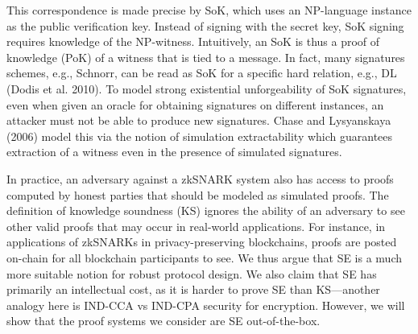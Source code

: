 \documentclass[11pt]{llncs}
\begin{document}
This correspondence is made precise by SoK, which uses an NP-language instance
as the public verification key. Instead of signing with the secret key, SoK
signing requires knowledge of the NP-witness. Intuitively, an SoK is thus a
proof of knowledge (PoK) of a witness that is tied to a message. In fact, many
signatures schemes, e.g., Schnorr, can be read as SoK for a specific hard
relation, e.g., DL (Dodis et al. 2010). To model strong existential unforgeability
of SoK signatures, even when given an oracle for obtaining signatures on
different instances, an attacker must not be able to produce new signatures.
Chase and Lysyanskaya (2006) model this via the notion of simulation
extractability which guarantees extraction of a witness even in the presence of
simulated signatures.

In practice, an adversary against a zkSNARK system also has access to proofs
computed by honest parties that should be modeled as simulated proofs. The
definition of knowledge soundness (KS) ignores the ability of an adversary to
see other valid proofs that may occur in real-world applications. For instance,
in applications of zkSNARKs in privacy-preserving blockchains, proofs are
posted on-chain for all blockchain participants to see. We thus argue that SE
is a much more suitable notion for robust protocol design. We also claim that
SE has primarily an intellectual cost, as it is harder to prove SE than
KS---another analogy here is IND-CCA vs IND-CPA security for encryption.
However, we will show that the proof systems we consider are SE out-of-the-box.
\end{document}
